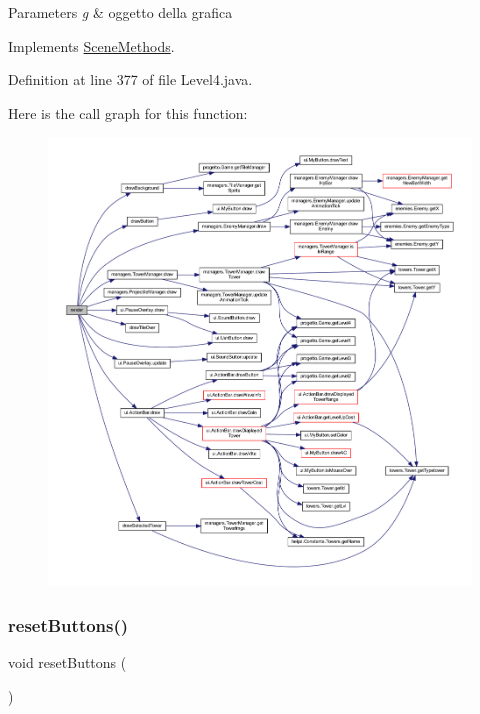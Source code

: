 \begin{DoxyParams}{Parameters}
{\em g} & oggetto della grafica \\
\hline
\end{DoxyParams}


Implements \hyperlink{interfacescenes_1_1_scene_methods_a203b6ad9d5e4d54dd1152986eec4dedc}{Scene\+Methods}.



Definition at line 377 of file Level4.\+java.

Here is the call graph for this function\+:
\nopagebreak
\begin{figure}[H]
\begin{center}
\leavevmode
\includegraphics[width=350pt]{classscenes_1_1_level4_a203b6ad9d5e4d54dd1152986eec4dedc_cgraph}
\end{center}
\end{figure}
\mbox{\label{classscenes_1_1_level4_a548cf4795e9d559d0c0cce0bb57a5251}} 
\subsubsection{\texorpdfstring{reset\+Buttons()}{resetButtons()}}
{\footnotesize\ttfamily void reset\+Buttons (\begin{DoxyParamCaption}{ }\end{DoxyParamCaption})\hspace{0.3cm}{\ttfamily [private]}}



